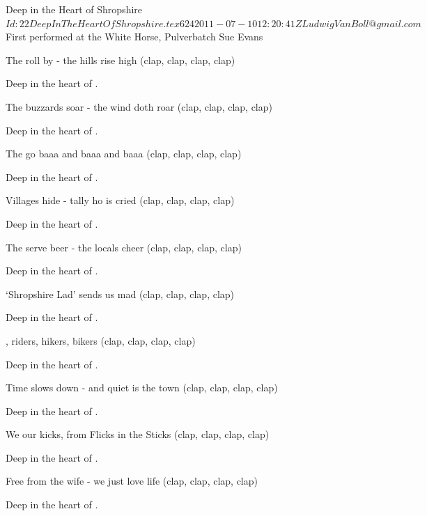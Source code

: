 \begin{SBSong}{Deep in the Heart of Shropshire}
  {$Id: 22DeepInTheHeartOfShropshire.tex 624 2011-07-10 12:20:41Z LudwigVanBoll@gmail.com $}
  {First performed at the White Horse, Pulverbatch}
  {Sue Evans}
  \begin{SBVerse}
    The  roll by - the hills rise high (clap, clap, clap, clap)
    
    Deep in the heart of . 
            
    The buzzards soar - the wind doth roar (clap, clap, clap, clap)
    
    Deep in the heart of . 
  \end{SBVerse}
  \begin{SBVerse}
    The  go baaa and baaa and baaa (clap, clap, clap, clap)
    
    Deep in the heart of . 
    
    Villages hide - tally ho is cried (clap, clap, clap, clap)
    
    Deep in the heart of . 
  \end{SBVerse}
  \begin{SBVerse}
    The  serve beer - the locals cheer (clap, clap, clap, clap)
    
    Deep in the heart of . 

    `Shropshire Lad' sends us mad (clap, clap, clap, clap)
    
    Deep in the heart of . 
  \end{SBVerse}
  \begin{SBVerse}
    , riders, hikers, bikers (clap, clap, clap, clap)
    
    Deep in the heart of . 
    
    Time slows down - and quiet is the town (clap, clap, clap, clap)
    
    Deep in the heart of . 
  \end{SBVerse}
  \begin{SBVerse}
    We  our kicks, from Flicks in the Sticks (clap, clap, clap, clap)
    
    Deep in the heart of . 
    
    Free from the wife - we just love life (clap, clap, clap, clap)
    
    Deep in the heart of . 
  \end{SBVerse}
\end{SBSong}
